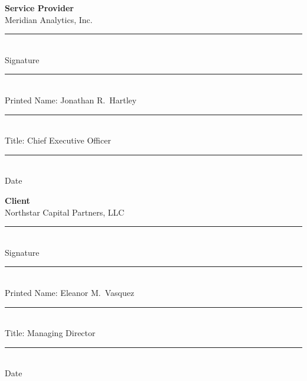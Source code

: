 \vspace{2em}
\noindent
\begin{minipage}[t]{0.48\textwidth}
  \centering
  \textbf{\color{accent}Service Provider}\\[4pt]
  {\footnotesize Meridian Analytics, Inc.}\\[2em]

  \noindent\rule{\linewidth}{0.3pt}\\[4pt]
  {\footnotesize Signature}\\[2em]

  \noindent\rule{\linewidth}{0.3pt}\\[4pt]
  {\footnotesize Printed Name: Jonathan R.\ Hartley}\\[1.5em]

  \noindent\rule{\linewidth}{0.3pt}\\[4pt]
  {\footnotesize Title: Chief Executive Officer}\\[1.5em]

  \noindent\rule{0.6\linewidth}{0.3pt}\\[4pt]
  {\footnotesize Date}
\end{minipage}
\hfill
\begin{minipage}[t]{0.48\textwidth}
  \centering
  \textbf{\color{accent}Client}\\[4pt]
  {\footnotesize Northstar Capital Partners, LLC}\\[2em]

  \noindent\rule{\linewidth}{0.3pt}\\[4pt]
  {\footnotesize Signature}\\[2em]

  \noindent\rule{\linewidth}{0.3pt}\\[4pt]
  {\footnotesize Printed Name: Eleanor M.\ Vasquez}\\[1.5em]

  \noindent\rule{\linewidth}{0.3pt}\\[4pt]
  {\footnotesize Title: Managing Director}\\[1.5em]

  \noindent\rule{0.6\linewidth}{0.3pt}\\[4pt]
  {\footnotesize Date}
\end{minipage}

